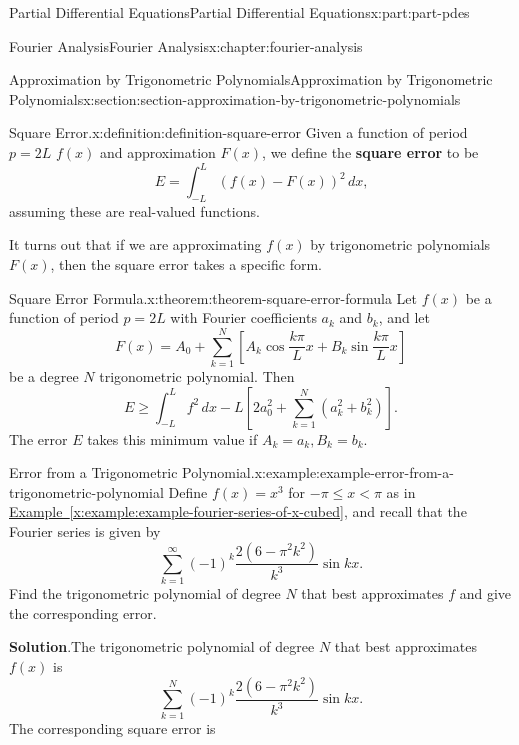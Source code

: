 \documentclass[oneside,10pt,]{book}
\newcommand{\blocktitlefont}{\relax}
\newcommand{\xreffont}{\relax}
\newcommand{\terminology}[1]{\textbf{#1}}
\numberwithin{equation}{part}
\begin{document}
\begin{partptx}{Partial Differential Equations}{}{Partial Differential Equations}{}{}{x:part:part-pdes}
\begin{chapterptx}{Fourier Analysis}{}{Fourier Analysis}{}{}{x:chapter:fourier-analysis}
\begin{sectionptx}{Approximation by Trigonometric Polynomials}{}{Approximation by Trigonometric Polynomials}{}{}{x:section:section-approximation-by-trigonometric-polynomials}
\begin{definition}{Square Error.}{x:definition:definition-square-error}%
Given a function of period \(p = 2L\) \(f(x)\) and approximation \(F(x)\), we define the \terminology{square error} to be%
\begin{equation*}
E = \int_{-L}^{L}(f(x) - F(x))^{2}\,dx\text{,}
\end{equation*}
assuming these are real-valued functions.%
\end{definition}
It turns out that if we are approximating \(f(x)\) by trigonometric polynomials \(F(x)\), then the square error takes a specific form.%
\begin{theorem}{Square Error Formula.}{}{x:theorem:theorem-square-error-formula}%
Let \(f(x)\) be a function of period \(p = 2L\) with Fourier coefficients \(a_{k}\) and \(b_{k}\), and let%
\begin{equation*}
F(x) = A_{0} + \sum_{k=1}^{N}[A_{k}\cos\frac{k\pi}{L}x + B_{k}\sin\frac{k\pi}{L}x]
\end{equation*}
be a degree \(N\) trigonometric polynomial. Then%
\begin{equation*}
E \geq \int_{-L}^{L}f^{2}\,dx - L\left[2a_{0}^{2} + \sum_{k=1}^{N}(a_{k}^{2} + b_{k}^{2})\right]\text{.}
\end{equation*}
The error \(E\) takes this minimum value if \(A_{k} = a_{k}, B_{k} = b_{k}\).%
\end{theorem}
\begin{example}{Error from a Trigonometric Polynomial.}{x:example:example-error-from-a-trigonometric-polynomial}%
Define \(f(x) = x^{3}\) for \(-\pi\leq x < \pi\) as in \hyperref[x:example:example-fourier-series-of-x-cubed]{Example~{\xreffont\ref{x:example:example-fourier-series-of-x-cubed}}}, and recall that the Fourier series is given by%
\begin{equation*}
\sum_{k = 1}^{\infty}(-1)^{k}\frac{2(6 - \pi^{2}k^{2})}{k^{3}}\sin kx\text{.}
\end{equation*}
Find the trigonometric polynomial of degree \(N\) that best approximates \(f\) and give the corresponding error.%
\par\smallskip%
\noindent\textbf{\blocktitlefont Solution}.\hypertarget{g:solution:idp105548780590112}{}\quad{}The trigonometric polynomial of degree \(N\) that best approximates \(f(x)\) is%
\begin{equation*}
\sum_{k = 1}^{N}(-1)^{k}\frac{2(6 - \pi^{2}k^{2})}{k^{3}}\sin kx\text{.}
\end{equation*}
The corresponding square error is%

\end{example}
\end{sectionptx}
\end{chapterptx}
\end{partptx}
\end{document}
